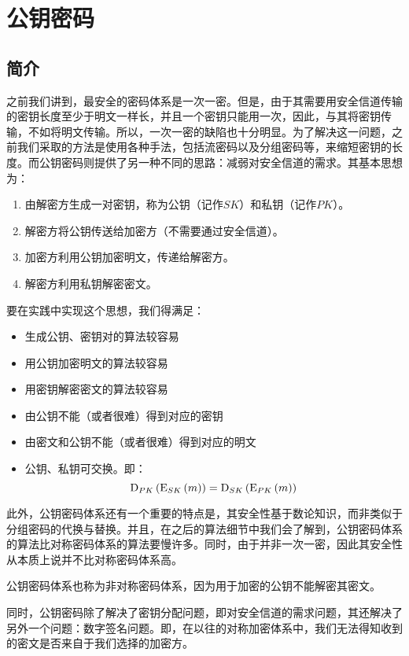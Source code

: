 \chapter{公钥密码}
\section{简介}
之前我们讲到，最安全的密码体系是一次一密。但是，由于其需要用安全信道传输的密钥长度至少于明文一样长，并且一个密钥只能用一次，因此，与其将密钥传输，不如将明文传输。所以，一次一密的缺陷也十分明显。为了解决这一问题，之前我们采取的方法是使用各种手法，包括流密码以及分组密码等，来缩短密钥的长度。而公钥密码则提供了另一种不同的思路：减弱对安全信道的需求。其基本思想为：
\begin{enumerate}
	\item 由解密方生成一对密钥，称为公钥（记作$SK$）和私钥（记作$PK$）。
	\item 解密方将公钥传送给加密方（不需要通过安全信道）。
	\item 加密方利用公钥加密明文，传递给解密方。
	\item 解密方利用私钥解密密文。
\end{enumerate}

要在实践中实现这个思想，我们得满足：
\begin{itemize}
	\item 生成公钥、密钥对的算法较容易
	\item 用公钥加密明文的算法较容易
	\item 用密钥解密密文的算法较容易
	\item 由公钥不能（或者很难）得到对应的密钥
	\item 由密文和公钥不能（或者很难）得到对应的明文
	\item 公钥、私钥可交换。即：
	\begin{equation}
	{\mathrm{D}_{PK}\left({{\mathrm{E}_{SK}\left({m}\right)}}\right)} = {\mathrm{D}_{SK}\left({{\mathrm{E}_{PK}\left({m}\right)}}\right)}
	\end{equation}
\end{itemize}

此外，公钥密码体系还有一个重要的特点是，其安全性基于数论知识，而非类似于分组密码的代换与替换。并且，在之后的算法细节中我们会了解到，公钥密码体系的算法比对称密码体系的算法要慢许多。同时，由于并非一次一密，因此其安全性从本质上说并不比对称密码体系高。\par
公钥密码体系也称为非对称密码体系，因为用于加密的公钥不能解密其密文。\par
同时，公钥密码除了解决了密钥分配问题，即对安全信道的需求问题，其还解决了另外一个问题：数字签名问题。即，在以往的对称加密体系中，我们无法得知收到的密文是否来自于我们选择的加密方。